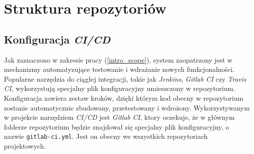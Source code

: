 \section{Struktura repozytoriów}

\subsection{Konfiguracja \textit{CI/CD}}

Jak zaznaczono w zakresie pracy (\ref{intro_scope}), system zaopatrzony jest w  
mechanizmy automatyzujące testowanie i wdrażanie nowych 
funkcjonalności. Popularne narzędzia do ciągłej integracji, takie jak
\textit{Jenkins}, \textit{Gitlab CI} czy \textit{Travis CI}, wykorzystują specjalny
plik konfiguracyjny umieszczony w repozytorium. Konfiguracja zawiera zestaw kroków,
dzięki którym kod obecny w repozytorium zostanie automatycznie
zbudowany, przetestowany i wdrożony. Wykorzystywanym w projekcie narzędziem \textit{CI/CD}
jest \textit{Gitlab CI}, ktory oczekuje, że w głównym folderze repozytorium będzie 
znajdował się specjalny plik konfiguracyjny, o nazwie \texttt{gitlab-ci.yml}. 
Jest on obecny we wszystkich repozytoriach projektowych.


